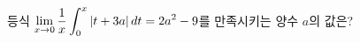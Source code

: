 등식 $\displaystyle\lim_{x\to 0}\dfrac{1}{x}\int_{0}^{x} |t+3a|\mkern3mu dt=2a^2-9$를 만족시키는 양수 $a$의 값은?
